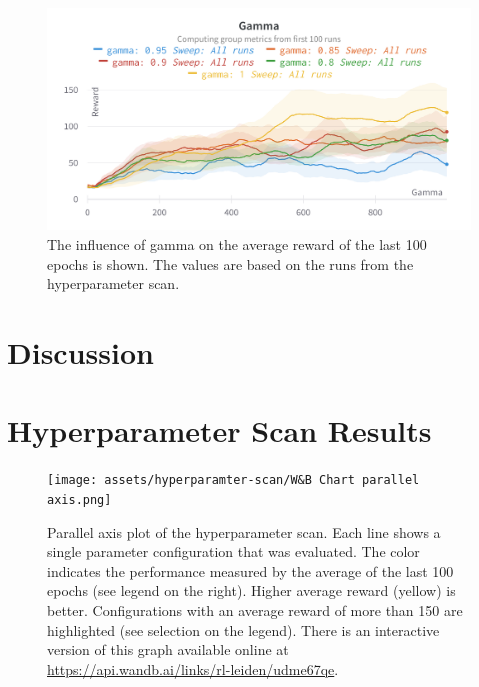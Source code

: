 \documentclass{article}
\begin{document}
\begin{figure}[ht!]
   \centering
   \includegraphics[width=\columnwidth]{assets/hyperparamter-scan/W&B Chart Gamma.png}
   \caption{The influence of gamma on the average reward of the last 100 epochs is shown. The values are based on the runs from the hyperparameter scan.
   }
   \label{fig_hyperparameter_scan_isolated_gamma}
\end{figure}

\section{Discussion}
\label{sec:discussion}




\nocite{DBLP:books/sp/Plaat22}





\appendix
\section{Hyperparameter Scan Results}
\label{sec:hyperparameter-scan-results}

\begin{figure}[ht!]
   \centering
   \texttt{[image: assets/hyperparamter-scan/W\&B Chart parallel axis.png]}
   \caption{Parallel axis plot of the hyperparameter scan. 
      Each line shows a single parameter configuration that was evaluated. 
      The color indicates the performance measured by the average of the last 100 epochs (see legend on the right). 
      Higher average reward (yellow) is better.
      Configurations with an average reward of more than 150 are highlighted (see selection on the legend).
      There is an interactive version of this graph available online at \url{https://api.wandb.ai/links/rl-leiden/udme67qe}.
   }
   \label{fig_hyperparameter_scan_parallel_axis}
\end{figure}
\end{document}
